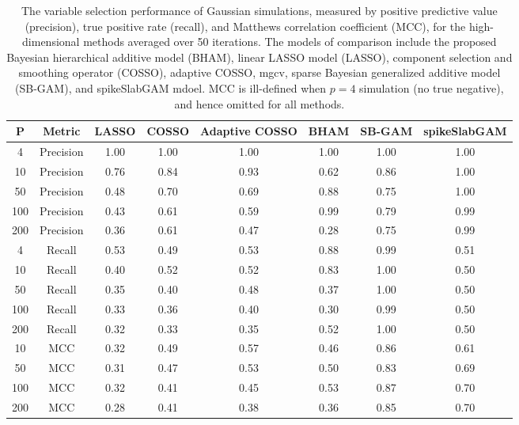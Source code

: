 \begin{table}[ht]
\centering
\begin{tabular}{cccccccc}
  \hline
P & Metric & LASSO & COSSO & Adaptive COSSO & BHAM & SB-GAM & spikeSlabGAM \\ 
  \hline
  4 & Precision & 1.00 & 1.00 & 1.00 & 1.00 & 1.00 & 1.00 \\ 
   10 & Precision & 0.76 & 0.84 & 0.93 & 0.62 & 0.86 & 1.00 \\ 
   50 & Precision & 0.48 & 0.70 & 0.69 & 0.88 & 0.75 & 1.00 \\ 
  100 & Precision & 0.43 & 0.61 & 0.59 & 0.99 & 0.79 & 0.99 \\ 
  200 & Precision & 0.36 & 0.61 & 0.47 & 0.28 & 0.75 & 0.99 \\ 
    4 & Recall & 0.53 & 0.49 & 0.53 & 0.88 & 0.99 & 0.51 \\ 
   10 & Recall & 0.40 & 0.52 & 0.52 & 0.83 & 1.00 & 0.50 \\ 
   50 & Recall & 0.35 & 0.40 & 0.48 & 0.37 & 1.00 & 0.50 \\ 
  100 & Recall & 0.33 & 0.36 & 0.40 & 0.30 & 0.99 & 0.50 \\ 
  200 & Recall & 0.32 & 0.33 & 0.35 & 0.52 & 1.00 & 0.50 \\ 
   10 & MCC & 0.32 & 0.49 & 0.57 & 0.46 & 0.86 & 0.61 \\ 
   50 & MCC & 0.31 & 0.47 & 0.53 & 0.50 & 0.83 & 0.69 \\ 
  100 & MCC & 0.32 & 0.41 & 0.45 & 0.53 & 0.87 & 0.70 \\ 
  200 & MCC & 0.28 & 0.41 & 0.38 & 0.36 & 0.85 & 0.70 \\ 
   \hline
\end{tabular}
\caption{The variable selection performance of Gaussian simulations, measured by positive predictive value (precision), true positive rate (recall), and Matthews correlation coefficient (MCC), for the high-dimensional methods averaged over 50 iterations. The models of comparison include the proposed Bayesian hierarchical additive model (BHAM), linear LASSO model (LASSO), component selection and smoothing operator (COSSO), adaptive COSSO, mgcv, sparse Bayesian generalized additive model (SB-GAM), and spikeSlabGAM mdoel. MCC is ill-defined when $p=4$ simulation (no true negative), and hence omitted for all methods.} 
\label{tab:sim_gaus_var_select}
\end{table}

